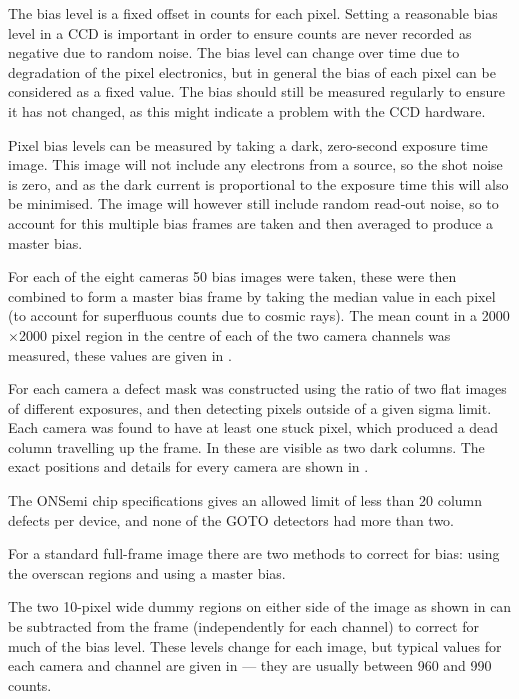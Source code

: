\begin{colsection}
\begin{colsection}
The bias level is a fixed offset in counts for each pixel. Setting a reasonable bias level in a CCD is important in order to ensure counts are never recorded as negative due to random noise. The bias level can change over time due to degradation of the pixel electronics, but in general the bias of each pixel can be considered as a fixed value. The bias should still be measured regularly to ensure it has not changed, as this might indicate a problem with the CCD hardware.

Pixel bias levels can be measured by taking a dark, zero-second exposure time image. This image will not include any electrons from a source, so the shot noise is zero, and as the dark current is proportional to the exposure time this will also be minimised. The image will however still include random read-out noise, so to account for this multiple bias frames are taken and then averaged to produce a master bias.

For each of the eight cameras 50 bias images were taken, these were then combined to form a master bias frame by taking the median value in each pixel (to account for superfluous counts due to cosmic rays). The mean count in a 2000$\times$2000 pixel region in the centre of each of the two camera channels was measured, these values are given in .



For each camera a defect mask was constructed using the ratio of two flat images of different exposures, and then detecting pixels outside of a given sigma limit. Each camera was found to have at least one stuck pixel, which produced a dead column travelling up the frame. In  these are visible as two dark columns. The exact positions and details for every camera are shown in .

The ONSemi chip specifications gives an allowed limit of less than 20 column defects per device, and none of the GOTO detectors had more than two.


For a standard full-frame image there are two methods to correct for bias: using the overscan regions and using a master bias.

The two 10-pixel wide dummy regions on either side of the image as shown in  can be subtracted from the frame (independently for each channel) to correct for much of the bias level. These levels change for each image, but typical values for each camera and channel are given in  --- they are usually between 960 and 990 counts.





\end{colsection}
\end{colsection}
